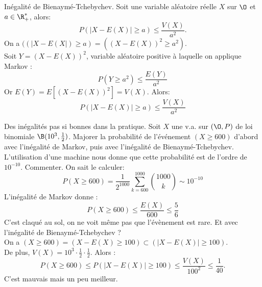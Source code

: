 \documentclass[11pt]{article}
\begin{document}
\pagebreak

\begin{prop}{Inégalité de Bienaymé-Tchebychev.}{}
    Soit une variable aléatoire réelle $X$ sur $\O$ et $a\in\R^*_+$, alors:
    \begin{equation*}
        P(|X-E(X)|\geq a)\leq\frac{V(X)}{a^2}.
    \end{equation*}
    \tcblower
    On a $((|X-E(X|)\geq a) = ((X-E(X))^2\geq a^2)$.\\
    Soit $Y=(X-E(X))^2$, variable aléatoire positive à laquelle on applique Markov :
    \begin{equation*}
        P(Y\geq a^2) \leq \frac{E(Y)}{a^2}
    \end{equation*}
    Or $E(Y)=E\left[ (X-E(X))^2 \right]=V(X).$ Alors:
    \begin{equation*}
        P(|X-E(X)|\geq a)\leq\frac{V(X)}{a^2}
    \end{equation*}
\end{prop}

\begin{ex}{Des inégalités pas si bonnes dans la pratique.}{}
    Soit $X$ une v.a. sur $(\O,P)$ de loi binomiale $\B(10^3,\frac{1}{2})$. Majorer la probabilité de l'événement $(X\geq600)$ d'abord avec l'inégalité de Markov, puis avec l'inégalité de Bienaymé-Tchebychev. L'utilisation d'une machine nous donne que cette probabilité est de l'ordre de $10^{-10}$. Commenter.
    \tcblower
    On sait le calculer:
    \begin{equation*}
        P(X\geq600)=\frac{1}{2^{1000}}\sum_{k=600}^{1000}\binom{1000}{k}\sim 10^{-10}
    \end{equation*}
    L'inégalité de Markov donne :
    \begin{equation*}
        P(X\geq600)\leq\frac{E(X)}{600}\leq\frac{5}{6}
    \end{equation*}
    C'est claqué au sol, on ne voit même pas que l'évènement est rare.\n
    Et avec l'inégalité de Bienaymé-Tchebychev ?\\
    On a $(X\geq600)=(X-E(X)\geq100)\subset(|X-E(X)|\geq100)$.\\
    De plus, $V(X)=10^3\cdot\frac{1}{2}\cdot\frac{1}{2}$. Alors :
    \begin{equation*}
        P(X\geq600)\leq P(|X-E(X)|\geq100) \leq \frac{V(X)}{100^2}\leq\frac{1}{40}.
    \end{equation*}
    C'est mauvais mais un peu meilleur.
\end{ex}
\end{document}
